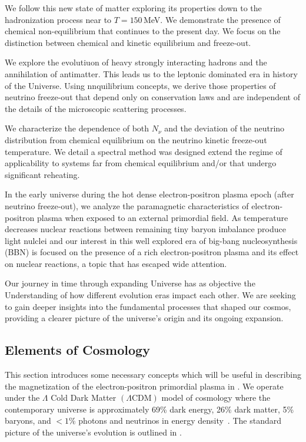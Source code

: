 We follow this new state of matter exploring its properties down to the hadronization process near to $T=150$\,MeV. We demonstrate the presence of chemical non-equilibrium that continues to the present day. We focus on the distinction between chemical and kinetic equilibrium and freeze-out.

We explore the evolutiuon of heavy strongly interacting hadrons and the annihilation of antimatter. This leads us to the leptonic dominated era in history of the Universe. Using nnquilibrium concepts, we derive those properties of neutrino freeze-out that depend only on conservation laws and are independent of the details of the microscopic scattering processes. 

We characterize the dependence of both $N_\nu$ and the deviation of the neutrino distribution from chemical equilibrium on the neutrino kinetic freeze-out temperature. We detail a spectral method was designed extend the regime of applicability to systems far from chemical equilibrium and/or that undergo significant reheating. 

In the early universe during the hot dense electron-positron plasma epoch (after neutrino freeze-out), we analyze the paramagnetic characteristics of electron-positron plasma when exposed to an external primordial field. As temperature decreases nuclear reactions between remaining tiny baryon imbalance produce light nulclei and our interest in this well explored era of big-bang nucleosynthesis (BBN) is focused on the presence of a rich electron-positron plasma and its effect on nuclear reactions, a topic that has escaped wide attention. 

Our journey in time through expanding Universe has as objective the Understanding of how different evolution eras impact each other. We are seeking to gain deeper insights into the fundamental processes that shaped our cosmos, providing a clearer picture of the universe's origin and its ongoing expansion.
\subsection{Elements of Cosmology}
\label{sec:flrw}
\noindent This section introduces some necessary concepts which will be useful in describing the magnetization of the electron-positron primordial plasma in . We operate under the $\Lambda$ Cold Dark Matter $(\Lambda\mathrm{CDM})$ model of cosmology where the contemporary universe is approximately 69\% dark energy, 26\% dark matter, 5\% baryons, and $<1$\% photons and neutrinos in energy density~\cite{Davis:2003ad,Planck:2018vyg}. The standard picture of the universe's evolution is outlined in .

